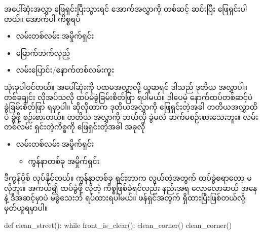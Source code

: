 အပေါ်ဆုံးအလွှာ ဖြေရှင်းပြီးသွားရင် အောက်အလွှာကို တစ်ဆင့် ဆင်းပြီး ဖြေရှင်းပါတယ်။ အောက်ပါ ကိစ္စရပ် 
%
\begin{itemize}
    \item လမ်းတစ်လမ်း အမှိုက်ရှင်း       
    \item မြောက်ဘက်လှည့် 
    \item လမ်းပြောင်း/နောက်တစ်လမ်းကူး 
\end{itemize}
%
သုံးခုပါဝင်တယ်။ အပေါ်ဆုံးကို ပထမအလွှာလို့ ယူဆရင် ဒါသည် ဒုတိယ အလွှာပါ။ တစ်ခုချင်း လိုအပ်သလို ထပ်မံခွဲခြမ်းစိတ်ဖြာ ရပါမယ်။ ဒါပေမဲ့ နောက်ထပ်တစ်ဆင့်ပဲ ခွဲခြမ်းစိတ်ဖြာ ရမှာပါ။ ဆိုလိုတာက ဒုတိယအလွှာကို ဖြေရှင်းတဲ့အခါ တတိယအလွှာထိပဲ ခွဲဖို့ စဉ်းစားတယ်။ တတိယ အလွှာကို ဘယ်လို ခွဲမလဲ ဆက်မစဉ်းစားသေးဘူး။ လမ်းတစ်လမ်း ရှင်းတဲ့ကိစ္စကို ဖြေရှင်းတဲ့အခါ အခုလို
%
\begin{itemize}
    \item လမ်းတစ်လမ်း အမှိုက်ရှင်း       
    \begin{itemize}
        \item ကွန်နာတစ်ခု အမှိုက်ရှင်း  
    \end{itemize}
\end{itemize}
%
ဒီကွန်ပို့စ်  လုပ်နိုင်တယ်။ ကွန်နာတစ်ခု ရှင်းတာက လွယ်တဲ့အတွက် ထပ်ခွဲစရာတော့ မလိုဘူး။ အကယ်၍ ထပ်ခွဲဖို့ လိုတဲ့ ကိစ္စဖြစ်ခဲ့ရင်လည်း  နည်းအရ လောလောဆယ် အနေနဲ့ ဒီအဆင့်မှာပဲ မခွဲသေးဘဲ ရပ်ထားရပါမယ်။  ဖန်ရှင်အတွက်  ရှိထားပြီးဖြစ်တယ်လို့ မှတ်ယူရမှာပါ။
%
\begin{py}
def clean_street():
    while front_is_clear():
        clean_corner()
    clean_corner()
\end{py}
%

